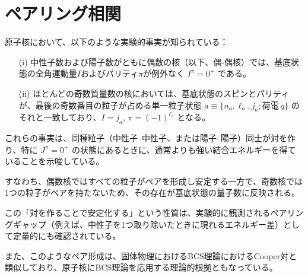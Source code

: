 \documentclass[a4paper]{jsreport}
\begin{document}
  \section{ペアリング相関}
    原子核において、以下のような実験的事実が知られている：

  \begin{itemize}
    \item[(i)] 中性子数および陽子数がともに偶数の核（以下、偶-偶核）では、基底状態の全角運動量$I$およびパリティ$\pi$が例外なく $I^\pi = 0^+$ である。
    \item[(ii)] ほとんどの奇数質量数の核においては、基底状態のスピンとパリティが、最後の奇数番目の粒子が占める単一粒子状態 $a \equiv \{n_a, \ell_a, j_a; \text{荷電}~q\}$ のそれと一致しており、$I = j_a$, $\pi = (-1)^{\ell_a}$ となる。
  \end{itemize}

  これらの事実は、同種粒子（中性子–中性子、または陽子–陽子）同士が対を作り、特に $J^\pi = 0^+$ の状態にあるときに、通常よりも強い結合エネルギーを得ていることを示唆している。

  すなわち、偶数核ではすべての粒子がペアを形成し安定する一方で、奇数核では1つの粒子がペアを持たないため、その存在が基底状態の量子数に反映される。

  この「対を作ることで安定化する」という性質は、実験的に観測されるペアリングギャップ（例えば、中性子を1つ取り除いたときに現れるエネルギー差）として定量的にも確認されている。

  また、このようなペア形成は、固体物理におけるBCS理論におけるCooper対と類似しており、原子核にBCS理論を応用する理論的根拠ともなっている。
\end{document}
